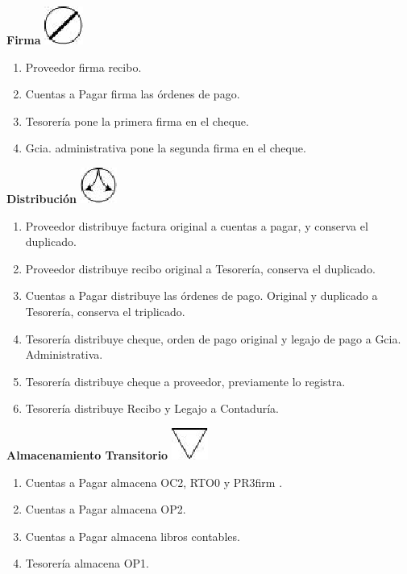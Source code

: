 \begin{center}
  \textbf{Firma}
  \includegraphics{./Images/Simbolos/simbolo-Firma.png}
\end{center}
\begin{enumerate}
  \item Proveedor firma recibo.
  \item Cuentas a Pagar firma las órdenes de pago.
  \item Tesorería pone la primera firma en el cheque.
  \item Gcia. administrativa pone la segunda firma en el cheque.
\end{enumerate}

\begin{center}
  \textbf{Distribución}
  \includegraphics{./Images/Simbolos/simbolo-Distribucion.png}
\end{center}
\begin{enumerate}
  \item Proveedor distribuye factura original a cuentas a pagar, y conserva el duplicado.
  \item Proveedor distribuye recibo original a Tesorería, conserva el duplicado.
  \item Cuentas a Pagar distribuye las órdenes de pago. Original y duplicado a Tesorería, conserva el triplicado.
  \item Tesorería distribuye cheque, orden de pago original y legajo de pago a Gcia. Administrativa.
  \item Tesorería distribuye cheque a proveedor, previamente lo registra.
  \item Tesorería distribuye Recibo y Legajo a Contaduría.
\end{enumerate}

\begin{center}
  \textbf{Almacenamiento Transitorio}
  \includegraphics{./Images/Simbolos/simbolo-Almacenamiento-Transitorio.png}
\end{center}
\begin{enumerate}
  \item Cuentas a Pagar almacena OC2, RTO0 y PR3firm .
  \item Cuentas a Pagar almacena OP2.
  \item Cuentas a Pagar almacena libros contables.
  \item Tesorería almacena OP1.
\end{enumerate}

